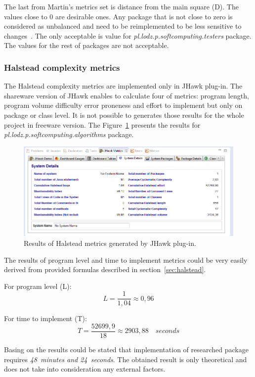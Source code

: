 The last from Martin's metrics set is distance from the main square (\ac{D}). The values close to 0 are desirable ones. Any package that is not close to zero is considered as unbalanced and need to be reimplemented to be less sensitive to changes~\cite{martin}. The only acceptable is value for \textit{pl.lodz.p.soft\-com\-pu\-ting.tes\-ters} package. The values for the rest of packages are not acceptable. 

\subsubsection*{Halstead complexity metrics}
The Halstead complexity metrics are implemented only in JHawk plug-in. The shareware version of JHawk enables to calculate four of metrics: program length, program volume difficulty error proneness and effort to implement but only on package or class level. It is not possible to generates those results for the whole project in freeware version. The Figure~\ref{fig:jhawk3} presents the results for  \textit{pl.lodz.p.soft\-com\-pu\-ting.al\-go\-rithms} package. 

\begin{figure}[h!]
	\centering
	\includegraphics[scale=0.7]{img/jhawk3.png}  
	\caption{Results of Halstead metrics generated by JHawk plug-in.}		
	\label{fig:jhawk3}
\end{figure}

The results of program level and time to implement metrics could be very easily derived from provided formulas described in section~\ref{sec:halstead}. 

For program level (L):
\[L=\frac { 1 }{ 1,04 } \approx 0,96\]

For time to implement (T):
\[T=\frac { 52699,9 }{ 18 } \approx 2903,88\quad seconds\]

Basing on the results could be stated that implementation of researched package requires \textit{48~minutes and 24~seconds}. The obtained result is only theoretical and does not take into consideration any external factors.  


